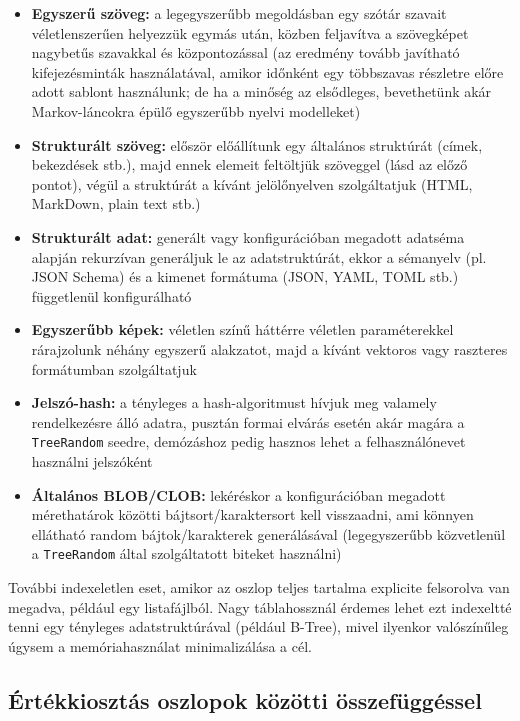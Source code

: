 \documentclass[
    parspace,
    noindent,
    nohyp,
]{elteiktdk}[2023/04/10]
\begin{document}
\begin{itemize}
  \item \textbf{Egyszerű szöveg:}
    a legegyszerűbb megoldásban egy szótár szavait véletlenszerűen helyezzük egymás után,
    közben feljavítva a szövegképet nagybetűs szavakkal és központozással
    (az eredmény tovább javítható kifejezésminták használatával,
    amikor időnként egy többszavas részletre előre adott sablont használunk;
    de ha a minőség az elsődleges, bevethetünk akár
    Markov-láncokra épülő egyszerűbb nyelvi modelleket\cite{Amrrs2021MarkovHeadlines})
  \item \textbf{Strukturált szöveg:}
    először előállítunk egy általános struktúrát (címek, bekezdések stb.),
    majd ennek elemeit feltöltjük szöveggel (lásd az előző pontot),
    végül a struktúrát a kívánt jelölőnyelven szolgáltatjuk (HTML, MarkDown, plain text stb.)
  \item \textbf{Strukturált adat:}
    generált vagy konfigurációban megadott adatséma alapján rekurzívan generáljuk le az adatstruktúrát,
    ekkor a sémanyelv (pl. JSON Schema) és a kimenet formátuma (JSON, YAML, TOML stb.)
    függetlenül konfigurálható
  \item \textbf{Egyszerűbb képek:}
    véletlen színű háttérre véletlen paraméterekkel
    rárajzolunk néhány egyszerű alakzatot,
    majd a kívánt vektoros vagy raszteres formátumban szolgáltatjuk
  \item \textbf{Jelszó-hash:}
    a tényleges a hash-algoritmust hívjuk meg valamely rendelkezésre álló adatra,
    pusztán formai elvárás esetén akár magára a \texttt{TreeRandom} seedre,
    demózáshoz pedig hasznos lehet a felhasználónevet használni jelszóként
  \item \textbf{Általános BLOB/CLOB:}
    lekéréskor a konfigurációban megadott mérethatárok közötti bájtsort/karaktersort kell visszaadni,
    ami könnyen ellátható random bájtok/karakterek generálásával
    (legegyszerűbb közvetlenül a \texttt{TreeRandom} által szolgáltatott biteket használni)
\end{itemize}

További indexeletlen eset, amikor az oszlop teljes tartalma explicite felsorolva van megadva,
például egy listafájlból.
Nagy táblahossznál érdemes lehet ezt indexeltté tenni egy tényleges adatstruktúrával (például B-Tree),
mivel ilyenkor valószínűleg úgysem a memóriahasználat minimalizálása a cél.

\subsection{Értékkiosztás oszlopok közötti összefüggéssel}
\end{document}

